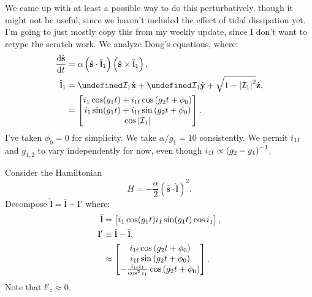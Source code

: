\documentclass[11pt,
        usenames, %
        dvipsnames %
    ]{article}
\newcommand*{\rd}[2]{\frac{\mathrm{d}#1}{\mathrm{d}#2}}
\newcommand*{\bm}[1]{\boldsymbol{\mathbf{#1}}}
\newcommand*{\uv}[1]{\hat{\bm{#1}}}
\newcommand*{\abs}[1]{\left|#1\right|}
\newcommand*{\p}[1]{\left(#1\right)}
\let\Re\undefined
\let\Im\undefined
\DeclareMathOperator{\Re}{Re}
\DeclareMathOperator{\Im}{Im}
\begin{document}
We came up with at least a possible way to do this perturbatively, though it
might not be useful, since we haven't included the effect of tidal dissipation
yet. I'm going to just mostly copy this from my weekly update, since I don't
want to retype the scratch work. We analyze Dong's equations, where:
\begin{align}
    \rd{\uv{s}}{t} &= \alpha\p{\uv{s} \cdot \uv{l}_1}\p{\uv{s} \times
        \uv{l}_1},\\
    \uv{l}_1 &= \Re \mathcal{I}_1\uv{x}
            + \Im \mathcal{I}_1 \uv{y}
            + \sqrt{1 - \abs{\mathcal{I}_1}^2}
            \uv{z},\label{eq:06/02/21.l1param}\\
        &= \begin{bmatrix}
            i_1 \cos (g_1t) + i_{\rm 1f} \cos\p{g_2 t + \phi_0}\\
            i_1 \sin (g_1t) + i_{\rm 1f} \sin\p{g_2 t + \phi_0}\\
            \cos\abs{\mathcal{I}_1}
        \end{bmatrix}.
\end{align}
I've taken $\phi_0 = 0$ for simplicity. We take $\alpha / g_1 = 10$
consistently. We permit $i_{\rm 1f}$ and $g_{1,2}$ to vary independently for
now, even though $i_{\rm 1f} \propto \p{g_2 - g_1}^{-1}$.

Consider the Hamiltonian
\begin{equation}
    H = - \frac{\alpha}{2}\p{\uv{s} \cdot \uv{l}}^2.
\end{equation}
Decompose $\uv{l} = \bar{\bm{l}} + \bm{l}'$ where:
\begin{align}
    \bar{\bm{l}} &= \begin{bmatrix}
        i_1 \cos (g_1t)
        i_1 \sin (g_1t)
        \cos i_1
    \end{bmatrix},\\
    \bm{l}' &\equiv \uv{l} - \bar{\bm{l}},\\
        &\approx \begin{bmatrix}
        i_{\rm 1f} \cos\p{g_2 t + \phi_0}\\
        i_{\rm 1f} \sin\p{g_2 t + \phi_0}\\
        -\frac{i_{\rm 1f}i_1}{\cos^2 i_1} \cos\p{g_2t + \phi_0}
    \end{bmatrix}.
\end{align}
Note that $l'_z \approx 0$.
\end{document}
